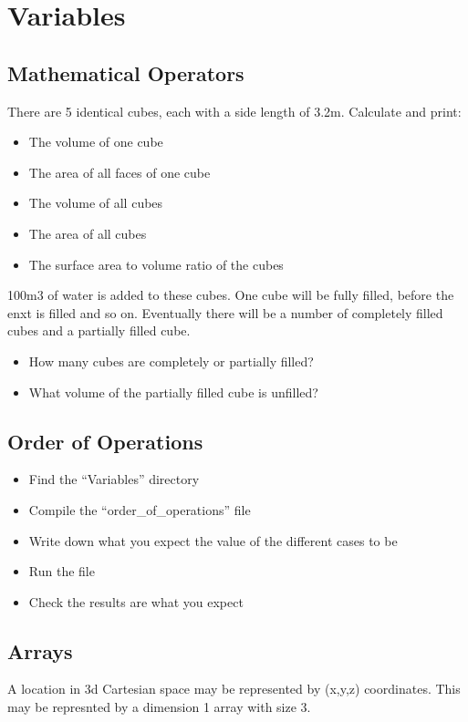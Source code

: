 \documentclass[11pt,a4paper]{article}
\begin{document}
\section{Variables}

\subsection{Mathematical Operators}
There are 5 identical cubes, each with a side length of 3.2m. Calculate and print:

\begin{itemize}
    \item The volume of one cube
    \item The area of all faces of one cube
    \item The volume of all cubes
    \item The area of all cubes
    \item The surface area to volume ratio of the cubes
\end{itemize}

100m3 of water is added to these cubes. One cube will be fully filled, before the enxt is filled and so on. Eventually there will be a number of completely filled cubes and a partially filled cube.

\begin{itemize}
    \item How many cubes are completely or partially filled?
    \item What volume of the partially filled cube is unfilled?
\end{itemize}


\subsection{Order of Operations}
\begin{itemize}
    \item Find the “Variables” directory
    \item Compile the “order\_of\_operations” file
    \item Write down what you expect the value of the different cases to be
    \item Run the file
    \item Check the results are what you expect
\end{itemize}

\subsection{Arrays}
A location in 3d Cartesian space may be represented by (x,y,z) coordinates. This may be represnted by a dimension 1 array with size 3.
\end{document}
